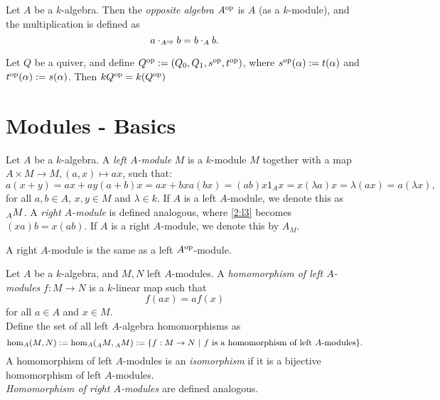 \begin{defn}
  Let $A$ be a $k$-algebra. Then the \emph{opposite algebra}  $A^{\mathrm{op}}$ is $A$ (as a $k$-module), and the multiplication is defined as
  \[
  a\cdot_{A^{\mathrm{op}}}b = b\cdot_Ab.
  \]
\end{defn}
\begin{bsp}
  Let $Q$ be a quiver, and define $Q^{\mathrm{op}}:= (Q_0,Q_1,s^{\mathrm{op}},t^{\mathrm{op}})$, where $s^{\mathrm{op}}(\alpha):= t(\alpha)$ and $t^{\mathrm{op}}(\alpha):= s(\alpha)$. Then $kQ^{\mathrm{op}}=k(Q^{\mathrm{op}})$
\end{bsp}
\section{Modules - Basics}
\begin{defn}
  Let $A$ be a $k$-algebra. A \emph{left $A$-module} $M$  is a $k$-module $M$ together with a map $A\times M\to M,(a,x)\mapsto ax$, such that:
  \begin{subequations}
    \begin{equation}\tag{L1}
      a(x+y)=ax+ay
    \end{equation}
    \begin{equation}\tag{L2}
      (a+b)x  = ax+bx
    \end{equation}
    \begin{equation}\tag{L3}\label{2:l3}
      a(bx) = (ab)x
    \end{equation}
    \begin{equation}\tag{L4}
      1_Ax=x
    \end{equation}
    \begin{equation}\tag{L5}
      (\lambda a)x=\lambda (ax) = a(\lambda x),
    \end{equation}
  \end{subequations}
  for all $a,b\in A$, $x,y\in M$ and $\lambda \in k$.
  If $A$ is a left $A$-module, we denote this as $\prescript{}{A}{M}$. A \emph{right $A$-module} is defined analogous, where \eqref{2:l3} becomes $(xa)b=x(ab)$. If $A$ is a right $A$-module, we denote this by $A_M$.
\end{defn}
\begin{rem}
  A right $A$-module is the same as a left $A^{\mathrm{op}}$-module.
\end{rem}
\begin{defn}
  Let $A$ be a $k$-algebra, and $M,N$ left $A$-modules. A \emph{homomorphism of left $A$-modules}  $f:M\to N$ is a $k$-linear map such that
  \[
  f(ax) = af(x)
  \]
  for all $a\in A$ and $x\in M$.\\
  Define the set of all left $A$-algebra homomorphisms as
  \[
  \hom_{A}(M,N):= \hom_{A}(\prescript{}{A}{M},\prescript{}{A}{M}) := \{f:M\to N ~|~ f \text{ is a homomorphism of left }A\text{-modules}\}.
  \]
  A homomorphism of left $A$-modules is an \emph{isomorphism} if it is a bijective homomorphism of left $A$-modules. \\
  \emph{Homomorphism of right $A$-modules} are defined analogous.
\end{defn}

